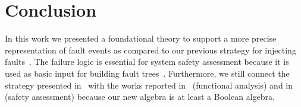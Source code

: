 \chapter{Conclusion}
\label{sec:conclusion}

%
%
%




In this work we presented a foundational theory to support a more precise representation of fault events as compared to our previous strategy for injecting faults~\cite{DM2012}.
%
The failure logic is essential for system safety assessment because it is used as basic input for building fault trees~\cite{PMS+2001,JMS+2011,GMS+2010}.
%
%
Furthermore, we still connect the strategy presented in~\cite{MJG+2010} with the works reported in~\cite{JMS+2011} (functional analysis) and in~\cite{GMS+2010,PMS+2001} (safety assessment) because our new algebra is at least a Boolean algebra.

